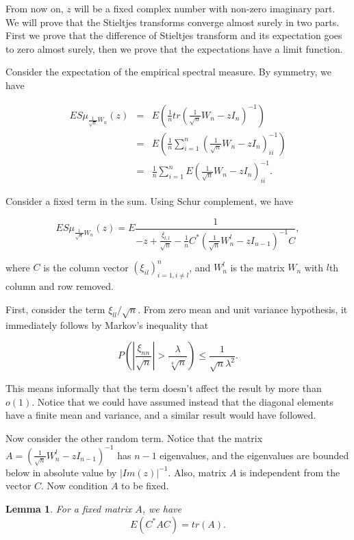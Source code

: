 \documentclass[12pt,a4paper,leqno]{report}
\theoremstyle{plain}
\newtheorem{lem}[equation]{Lemma}
\theoremstyle{definition}
\theoremstyle{remark}
\begin{document}
From now on, $z$ will be a fixed complex number with non-zero imaginary part. We will prove that the Stieltjes transforms converge almost surely in two parts. First we prove that the difference of Stieltjes transform and its expectation goes to zero almost surely, then we prove that the expectations have a limit function.

Consider the expectation of the empirical spectral measure.  By symmetry, we have

\begin{eqnarray*}
ES\mu_{\frac{1}{\sqrt{n}}W_n}(z) & = &
E(\frac{1}{n} tr(\frac{1}{\sqrt{n}}W_n - z I_n)^{-1})\\
& = & E(\frac{1}{n} \sum_{i=1}^n(\frac{1}{\sqrt{n}}W_n - z I_n)^{-1}_{ii})\\
& = & \frac{1}{n} \sum_{i=1}^n E(\frac{1}{\sqrt{n}}W_n - z I_n)^{-1}_{ii}.
\end{eqnarray*}

Consider a fixed term in the sum.
Using Schur complement, we have

\begin{equation*}
ES\mu_{\frac{1}{\sqrt{n}}W_n}(z) = E\frac{1}{-z+\frac{\xi_{l,l}}{\sqrt{n}}-\frac{1}{n}C^* (\frac{1}{\sqrt{n}}W_n^l-zI_{n-1})^{-1}C},
\end{equation*}

where $C$ is the column vector $(\xi_{il})_{i=1, i\neq l}^{n}$, and $W_n^l$ is the matrix $W_n$ with $l$th column and row removed.

First, consider the term $\xi_{ll}/\sqrt{n}$. From zero mean and unit variance hypothesis, it immediately follows by Markov's inequality that

\begin{equation*}
P(|\frac{\xi_{nn}}{\sqrt{n}}|>\frac{\lambda}{\sqrt[4]{n}}) \leq \frac{1}{\sqrt{n}\lambda^2}. 
\end{equation*}

This means informally that the term doesn't affect the result by more than $o(1)$. Notice that we could have assumed instead that the diagonal elements have a finite mean and variance, and a similar result would have followed.

Now consider the other random term. Notice that the matrix $A = (\frac{1}{\sqrt{n}}W_n^l-zI_{n-1})^{-1}$ has $n-1$ eigenvalues, and the eigenvalues are bounded below in absolute value by $|Im(z)|^{-1}$. Also, matrix $A$ is independent from the vector $C$. Now condition $A$ to be fixed.

\begin{lem}
For a fixed matrix $A$, we have
\begin{equation*}
E(C^* A C) = tr(A).
\end{equation*}
\end{lem}
\end{document}
